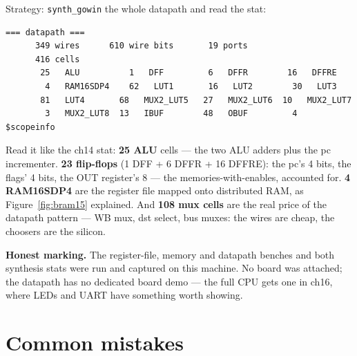 \begin{example}
Strategy: \texttt{synth\_gowin} the whole datapath and read the stat:

\begin{lstlisting}[caption={\ttfamily synth\_gowin stat for
\texttt{datapath} --- real output, trimmed.}]
=== datapath ===
      349 wires      610 wire bits       19 ports
      416 cells
       25   ALU          1   DFF         6   DFFR        16   DFFRE
        4   RAM16SDP4    62   LUT1       16   LUT2        30   LUT3
       81   LUT4       68   MUX2_LUT5   27   MUX2_LUT6  10   MUX2_LUT7
        3   MUX2_LUT8  13   IBUF        48   OBUF         4   $scopeinfo
\end{lstlisting}

Read it like the ch14 stat: \textbf{25 ALU} cells --- the two ALU
adders plus the pc incrementer. \textbf{23 flip-flops} (1 DFF + 6
DFFR + 16 DFFRE): the pc's 4 bits, the flags' 4 bits, the OUT
register's 8 --- the memories-with-enables, accounted for.
\textbf{4 RAM16SDP4} are the register file mapped onto distributed
RAM, as Figure~\ref{fig:bram15} explained. And \textbf{108 mux cells}
are the real price of the datapath pattern --- WB mux, dst select,
bus muxes: the wires are cheap, the choosers are the silicon.
\end{example}

\textbf{Honest marking.} The register-file, memory and datapath
benches and both synthesis stats were run and captured on this
machine. No board was attached; the datapath has no dedicated board
demo --- the full CPU gets one in ch16, where LEDs and UART have
something worth showing.

\section{Common mistakes}\label{sec:cm15}

